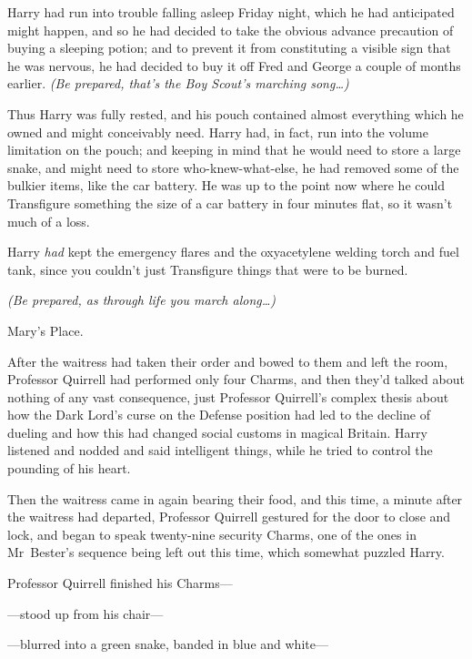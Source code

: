 

\hplettrineextrapara
Harry had run into trouble falling asleep Friday night, which he had anticipated might happen, and so he had decided to take the obvious advance precaution of buying a sleeping potion; and to prevent it from constituting a visible sign that he was nervous, he had decided to buy it off Fred and George a couple of months earlier. \emph{(Be prepared, that's the Boy Scout's marching song{\ldots})}

Thus Harry was fully rested, and his pouch contained almost everything which he owned and might conceivably need. Harry had, in fact, run into the volume limitation on the pouch; and keeping in mind that he would need to store a large snake, and might need to store who-knew-what-else, he had removed some of the bulkier items, like the car battery. He was up to the point now where he could Transfigure something the size of a car battery in four minutes flat, so it wasn't much of a loss.

Harry \emph{had} kept the emergency flares and the oxyacetylene welding torch and fuel tank, since you couldn't just Transfigure things that were to be burned.

\emph{(Be prepared, as through life you march along{\ldots})}

Mary's Place.

After the waitress had taken their order and bowed to them and left the room, Professor Quirrell had performed only four Charms, and then they'd talked about nothing of any vast consequence, just Professor Quirrell's complex thesis about how the Dark Lord's curse on the Defense position had led to the decline of dueling and how this had changed social customs in magical Britain. Harry listened and nodded and said intelligent things, while he tried to control the pounding of his heart.

Then the waitress came in again bearing their food, and this time, a minute after the waitress had departed, Professor Quirrell gestured for the door to close and lock, and began to speak twenty-nine security Charms, one of the ones in Mr~Bester's sequence being left out this time, which somewhat puzzled Harry.

Professor Quirrell finished his Charms—

—stood up from his chair—

—blurred into a green snake, banded in blue and white—

